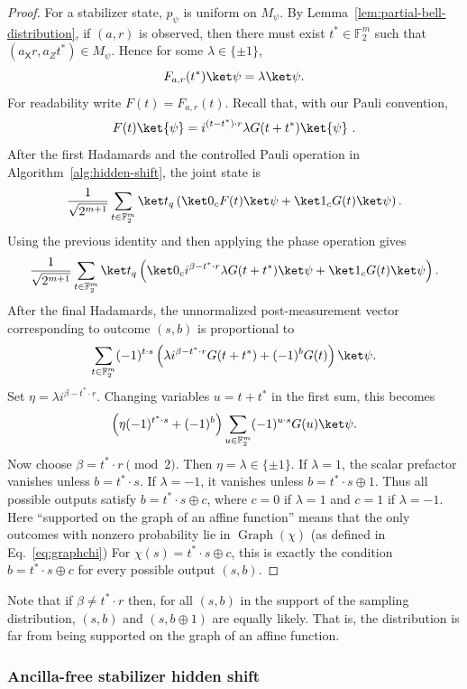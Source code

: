 \documentclass[11pt]{article}
\newcommand{\X}{\mathsf{X}}
\newcommand{\F}{\mathbb{F}}
\newcommand{\Graph}{\operatorname{Graph}}
\begin{document}
\begin{proof}
For a stabilizer state, $p_\psi$ is uniform on $M_\psi$.  By
Lemma~\ref{lem:partial-bell-distribution}, if $(a,r)$ is observed, then there
must exist $t^*\in\F_2^m$ such that $(a_\X r, a_Zt^*) \in M_\psi$.  Hence for
some $\lambda\in\{\pm1\}$,
$$
    F_{a,r}(t^*)\ket\psi=\lambda\ket\psi.
$$
For readability write $F(t)=F_{a,r}(t)$. Recall that, with our Pauli convention,
$$
    F(t) \ket{\psi} = i^{(t-t^*)\cdot r}\lambda G(t+t^*)\ket{\psi}\ .
$$
After the first Hadamards and the controlled Pauli operation in
Algorithm~\ref{alg:hidden-shift}, the joint state is
$$
    \frac{1}{\sqrt{2^{m+1}}}
    \sum_{t\in\F_2^m}\ket t_q
    \left(\ket0_c F(t)\ket\psi+\ket1_c G(t)\ket\psi\right).
$$
Using the previous identity and then applying the phase operation gives
$$
    \frac{1}{\sqrt{2^{m+1}}}
    \sum_{t\in\F_2^m}\ket t_q
    \left(\ket0_c i^{\beta-t^*\cdot r}\lambda G(t+t^*)\ket\psi
    +\ket1_c G(t)\ket\psi\right).
$$
After the final Hadamards, the unnormalized post-measurement vector
corresponding to outcome $(s,b)$ is proportional to
$$
    \sum_{t\in\F_2^m}(-1)^{t\cdot s}
    \left(\lambda i^{\beta-t^*\cdot r}G(t+t^*)+(-1)^bG(t)\right)\ket\psi.
$$
Set $\eta=\lambda i^{\beta-t^*\cdot r}$.  Changing variables $u=t+t^*$ in the
first sum, this becomes
$$
    \left(\eta(-1)^{t^*\cdot s}+(-1)^b\right)
    \sum_{u\in\F_2^m}(-1)^{u\cdot s}G(u)\ket\psi.
$$
Now choose $\beta=t^*\cdot r\pmod 2$.  Then $\eta=\lambda\in\{\pm1\}$.  If
$\lambda=1$, the scalar prefactor vanishes unless $b=t^*\cdot s$.  If
$\lambda=-1$, it vanishes unless $b=t^*\cdot s\oplus 1$.  Thus all possible
outputs satisfy $b=t^*\cdot s\oplus c$, where $c=0$ if $\lambda=1$ and $c=1$
if $\lambda=-1$. Here ``supported on the graph of an affine function'' means that the only
outcomes with nonzero probability lie in
$\Graph(\chi)$ (as defined in Eq.~\eqref{eq:graphchi}) 
For $\chi(s)=t^*\cdot s\oplus c$, this is exactly the condition
$b=t^*\cdot s\oplus c$ for every possible output $(s,b)$.
\end{proof}

Note that if $\beta \neq t^* \cdot r$ then, for all $(s,b)$ in the support of the sampling distribution, $(s,b)$ and $(s,b\oplus 1)$ are equally likely. That is, the distribution is far from being supported on the graph of an affine function.

\subsubsection{Ancilla-free stabilizer hidden shift}\label{sec:shift_no_ancilla}
\end{document}
